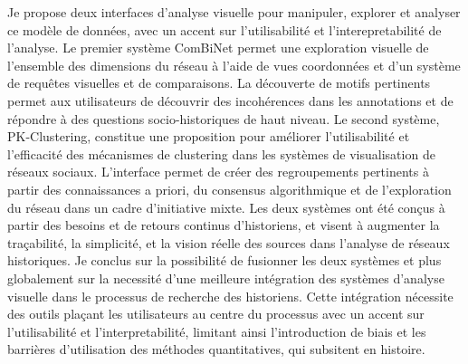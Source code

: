 {    Je propose deux interfaces d'analyse visuelle pour manipuler, explorer et analyser ce modèle de données, avec un accent sur l'utilisabilité et l'interepretabilité de l'analyse.
    Le premier système ComBiNet permet une exploration visuelle de l'ensemble des dimensions du réseau à l'aide de vues coordonnées et d'un système de requêtes visuelles et de comparaisons.
    La découverte de motifs pertinents permet aux utilisateurs de découvrir des incohérences dans les annotations et de répondre à des questions socio-historiques de haut niveau.
    Le second système, PK-Clustering, constitue une proposition pour améliorer l'utilisabilité et l'efficacité des mécanismes de clustering dans les systèmes de visualisation de réseaux sociaux.
    L'interface permet de créer des regroupements pertinents à partir des connaissances a priori, du consensus algorithmique et de l'exploration du réseau dans un cadre d'initiative mixte.
    Les deux systèmes ont été conçus à partir des besoins et de retours continus d'historiens, et visent à augmenter la traçabilité, la simplicité, et la vision réelle des sources dans l'analyse de réseaux historiques.
    Je conclus sur la possibilité de fusionner les deux systèmes et plus globalement sur la necessité d'une meilleure intégration des systèmes d'analyse visuelle dans le processus de recherche des historiens.
    Cette intégration nécessite des outils plaçant les utilisateurs au centre du processus avec un accent sur l'utilisabilité et l'interpretabilité, limitant ainsi l'introduction de biais et les barrières d'utilisation des méthodes quantitatives, qui subsitent en histoire.
}

